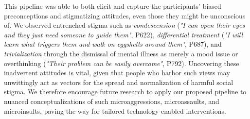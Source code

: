 
This pipeline was able to both elicit and capture the participants' biased preconceptions and stigmatizing attitudes, even those they might be unconscious of.
We observed entrenched stigma such as \textit{condescension} (\textit{"I can open their eyes and they just need someone to guide them"}, P622), \textit{differential treatment} (\textit{"I will learn what triggers them and walk on eggshells around them"}, P687), and \textit{trivialization} through the dismissal of mental illness as merely a mood issue or overthinking (\textit{"Their problem can be easily overcome"}, P792). 
Uncovering these inadvertent attitudes is vital, given that people who harbor such views may unwittingly act as vectors for the spread and normalization of harmful social stigma. 
We therefore encourage future research to apply our proposed pipeline to nuanced conceptualizations of such microaggressions, microassaults, and microinsults, paving the way for tailored technology-enabled interventions.








